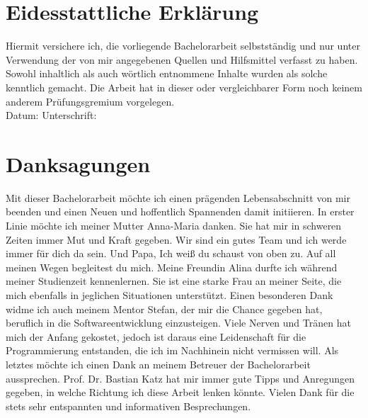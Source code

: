 \setcounter{secnumdepth}{0}
\section{Eidesstattliche Erklärung}

Hiermit versichere ich, die vorliegende Bachelorarbeit selbstständig und nur unter Verwendung der von mir angegebenen Quellen und Hilfsmittel verfasst zu haben. Sowohl inhaltlich als auch wörtlich entnommene Inhalte wurden als solche kenntlich gemacht. Die Arbeit hat in dieser oder vergleichbarer Form noch keinem anderem Prüfungsgremium vorgelegen.
\\[1.5cm]
Datum:	\hrulefill\enspace Unterschrift: \hrulefill


\newpage

\section{Danksagungen}
Mit dieser Bachelorarbeit möchte ich einen prägenden Lebensabschnitt von mir beenden und einen Neuen und hoffentlich Spannenden damit initiieren. In erster Linie möchte ich meiner Mutter Anna-Maria danken. Sie hat mir in schweren Zeiten immer Mut und Kraft gegeben. Wir sind ein gutes Team und ich werde immer für dich da sein. Und Papa, Ich weiß du schaust von oben zu. Auf all meinen Wegen begleitest du mich. Meine Freundin Alina durfte ich während meiner Studienzeit kennenlernen. Sie ist eine starke Frau an meiner Seite, die mich ebenfalls in jeglichen Situationen unterstützt. Einen besonderen Dank widme ich auch meinem Mentor Stefan, der mir die Chance gegeben hat, beruflich in die Softwareentwicklung einzusteigen. Viele Nerven und Tränen hat mich der Anfang gekostet, jedoch ist daraus eine Leidenschaft für die Programmierung entstanden, die ich im Nachhinein nicht vermissen will. Als letztes möchte ich einen Dank an meinem Betreuer der Bachelorarbeit aussprechen. Prof. Dr. Bastian Katz hat mir immer gute Tipps und Anregungen gegeben, in welche Richtung ich diese Arbeit lenken könnte. Vielen Dank für die stets sehr entspannten und informativen Besprechungen.
